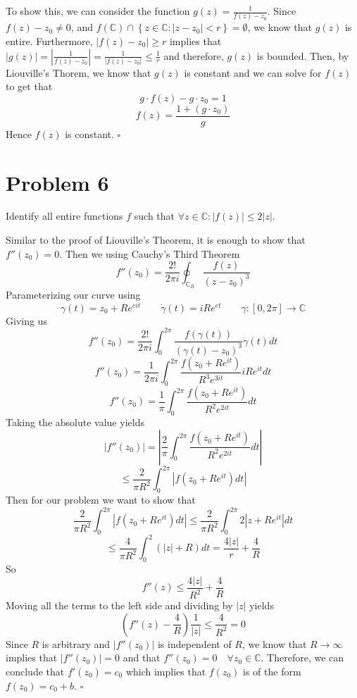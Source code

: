 \documentclass[12pt]{article}
\newcommand{\C}{\mathbb{C}}
\newcommand{\set}[1]{\left\{ #1\right\}}
\newenvironment{proof}{\noindent{\bf Proof.}}{\hfill $\square$\medskip}
\begin{document}
\begin{proof}
To show this, we can consider the function $g(z)=\frac{1}{f(z)-z_{0}}$. Since $f(z)-z_{0}\neq 0$, and $f(\C)\cap\set{z\in\C:\left |z-z_{0}\right |<r}=\emptyset$, we know that $g(z)$ is entire. Furthermore, $|f(z)-z_{0}|\geq r$ implies that $|g(z)|=\left |\frac{1}{f(z)-z_{0}}\right |=\frac{1}{|f(z)-z_{0}|}\leq\frac{1}{r}$ and therefore, $g(z)$ is bounded. Then, by Liouville's Thorem, we know that $g(z)$ is constant and we can solve for $f(z)$ to get that
$$g\cdot f(z)-g\cdot z_{0}=1$$
$$f(z)=\frac{1+(g\cdot z_{0})}{g}$$
Hence $f(z)$ is constant.
\end{proof}


\section{Problem 6}
Identify all entire functions $f$ such that $\forall z\in\C: \left |f(z)\right |\leq 2\left |z\right |$.

\begin{proof}
Similar to the proof of Liouville's Theorem, it is enough to show that $f''(z_{0})=0$. Then we using Cauchy's Third Theorem
$$f''(z_{0})=\frac{2!}{2\pi i}\oint_{\C_{R}}\frac{f(z)}{(z-z_{0})^{3}}$$
Parameterizing our curve using
$$\gamma(t)=z_{0}+Re^{eit}\qquad \dot{\gamma}(t)=iRe^{et}\qquad \gamma:[0,2\pi]\to\C$$
Giving us
$$f''(z_{0})=\frac{2!}{2\pi i}\int_{0}^{2\pi}\frac{f(\gamma(t))}{(\gamma(t)-z_{0})^{3}}\dot{\gamma}(t)dt$$
$$f''(z_{0})=\frac{1}{2\pi i}\int_{0}^{2\pi}\frac{f(z_{0}+Re^{it})}{R^{3}e^{3it}}iRe^{it}dt$$
$$f''(z_{0})=\frac{1}{\pi}\int_{0}^{2\pi}\frac{f(z_{0}+Re^{it})}{R^{2}e^{2it}}dt$$
Taking the absolute value yields
$$|f''(z_{0})|=\left |\frac{2}{\pi}\int_{0}^{2\pi}\frac{f(z_{0}+Re^{it})}{R^{2}e^{2it}}dt \right |$$
$$\leq\frac{2}{\pi R^{2}}\int_{0}^{2\pi}\left |f(z_{0}+Re^{it})dt \right |$$
Then for our problem we want to show that
$$\frac{2}{\pi R^{2}}\int_{0}^{2\pi}\left |f(z_{0}+Re^{it})dt \right |\leq\frac{2}{\pi R^{2}}\int_{0}^{2\pi}2\left |z+Re^{it} \right |dt$$
$$\leq\frac{4}{\pi R^{2}}\int_{0}^{2}(|z|+R)dt=\frac{4|z|}{r}+\frac{4}{R}$$
So
$$f''(z)\leq \frac{4|z|}{R^{2}}+\frac{4}{R}$$
Moving all the terms to the left side and dividing by $|z|$ yields
$$\left (f''(z)-\frac{4}{R}\right )\frac{1}{|z|}\leq \frac{4}{R^{2}}=0$$
Since $R$ is arbitrary and $|f''(z_{0})|$ is independent of $R$, we know that $R\to\infty$ implies that $|f''(z_{0})|=0$ and that $f''(z_{0})=0\quad \forall z_{0}\in\C$. Therefore, we can conclude that $f'(z_{0})=c_0$ which implies that $f(z_{0})$ is of the form $f(z_{0})=c_{0}+b$.
\end{proof}
\end{document}
